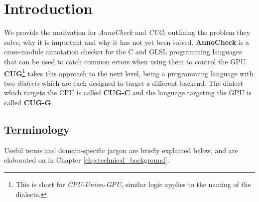\documentclass[a4paper,12pt,twoside,openright]{report}
\begin{document}
\pagestyle{empty}
\singlespacing

\onehalfspacing

\singlespacing

\singlespacing


\setcounter{page}{0}
\pagestyle{plain}
\tableofcontents

\onehalfspacing


\chapter{Introduction}
\setcounter{page}{1}

\label{sec:TODO}

We provide the motivation for \textit{AnnoCheck} and \textit{CUG}: outlining
the problem they solve, why it is important and why it has not yet been solved.
\textbf{AnnoCheck} is a cross-module annotation checker for the C and GLSL
programming languages that can be used to catch common errors when using them
to control the GPU. \textbf{CUG}\footnote{This is short for
\textit{CPU-Union-GPU}, similar logic applies to the naming of the dialects.}
takes this approach to the next level, being a programming language with two
\textit{dialects} which are each designed to target a different backend. The
dialect which targets the CPU is called \textbf{CUG-C} and the language
targeting the GPU is called \textbf{CUG-G}.

\section{Terminology}


Useful terms and domain-specific jargon are briefly explained below, and are
elaborated on in Chapter \ref{chp:technical_background}.
\end{document}
